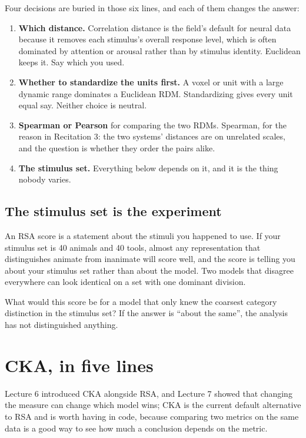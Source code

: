\documentclass[11pt]{article}
\begin{document}
Four decisions are buried in those six lines, and each of them changes the
answer:

\begin{enumerate}
  \item \textbf{Which distance.} Correlation distance is the field's default for
        neural data because it removes each stimulus's overall response level,
        which is often dominated by attention or arousal rather than by
        stimulus identity. Euclidean keeps it. Say which you used.
  \item \textbf{Whether to standardize the units first.} A voxel or unit with a
        large dynamic range dominates a Euclidean RDM. Standardizing gives every
        unit equal say. Neither choice is neutral.
  \item \textbf{Spearman or Pearson} for comparing the two RDMs. Spearman, for
        the reason in Recitation 3: the two systems' distances are on unrelated
        scales, and the question is whether they order the pairs alike.
  \item \textbf{The stimulus set.} Everything below depends on it, and it is the
        thing nobody varies.
\end{enumerate}

\subsection{The stimulus set is the experiment}

An RSA score is a statement about the stimuli you happened to use. If your
stimulus set is 40 animals and 40 tools, almost any representation that
distinguishes animate from inanimate will score well, and the score is telling
you about your stimulus set rather than about the model. Two models that
disagree everywhere can look identical on a set with one dominant division.

\begin{keybox}
 What would this score be for a
model that only knew the coarsest category distinction in the stimulus set? If
the answer is ``about the same'', the analysis has not distinguished anything.
\end{keybox}

\section{CKA, in five lines}

Lecture 6 introduced CKA alongside RSA, and Lecture 7 showed that changing the
measure can change which model wins; CKA is the current default alternative to
RSA and is worth having in code, because comparing two metrics on the same data
is a good way to see how much a conclusion depends on the metric.
\end{document}
